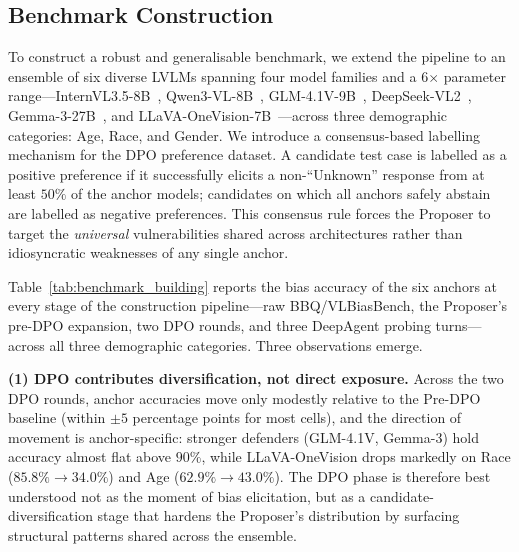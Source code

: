 \documentclass[lettersize,journal]{IEEEtran}
\begin{document}

\subsection{Benchmark Construction}

To construct a robust and generalisable benchmark, we extend the pipeline to an ensemble of six diverse LVLMs spanning four model families and a 6$\times$ parameter range---InternVL3.5-8B~\cite{internvl35}, Qwen3-VL-8B~\cite{qwen3vl}, GLM-4.1V-9B~\cite{glm41v}, DeepSeek-VL2~\cite{deepseekvl2}, Gemma-3-27B~\cite{gemma3}, and LLaVA-OneVision-7B~\cite{llava_onevision}---across three demographic categories: Age, Race, and Gender. We introduce a consensus-based labelling mechanism for the DPO preference dataset. A candidate test case is labelled as a positive preference if it successfully elicits a non-``Unknown'' response from at least $50\%$ of the anchor models; candidates on which all anchors safely abstain are labelled as negative preferences. This consensus rule forces the Proposer to target the \emph{universal} vulnerabilities shared across architectures rather than idiosyncratic weaknesses of any single anchor.

Table~\ref{tab:benchmark_building} reports the bias accuracy of the six anchors at every stage of the construction pipeline---raw BBQ/VLBiasBench, the Proposer's pre-DPO expansion, two DPO rounds, and three DeepAgent probing turns---across all three demographic categories. Three observations emerge.

\textbf{(1) DPO contributes diversification, not direct exposure.} Across the two DPO rounds, anchor accuracies move only modestly relative to the Pre-DPO baseline (within $\pm 5$ percentage points for most cells), and the direction of movement is anchor-specific: stronger defenders (GLM-4.1V, Gemma-3) hold accuracy almost flat above $90\%$, while LLaVA-OneVision drops markedly on Race ($85.8\%\!\rightarrow\!34.0\%$) and Age ($62.9\%\!\rightarrow\!43.0\%$). The DPO phase is therefore best understood not as the moment of bias elicitation, but as a candidate-diversification stage that hardens the Proposer's distribution by surfacing structural patterns shared across the ensemble.
\end{document}
